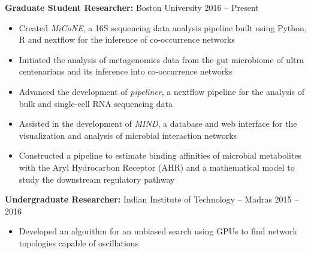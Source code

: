 \documentclass[10pt]{developercv} %
\begin{document}


\begin{minipage}[t]{\textwidth}
	\vspace{-\baselineskip} %

    \textbf{Graduate Student Researcher:} Boston University \hfill 2016 -- Present
    \vspace{-1mm}
    \begin{itemize}[itemsep=-4pt]
      \item Created \textit{MiCoNE}, a 16S sequencing data analysis pipeline built using Python, R and nextflow for the inference of co-occurrence networks
      \item Initiated the analysis of metagenomics data from the gut microbiome of ultra centenarians and its inference into co-occurrence networks
      \item Advanced the development of \textit{pipeliner}, a nextflow pipeline for the analysis of bulk and single-cell RNA sequencing data
      \item Assisted in the development of \textit{MIND}, a database and web interface for the visualization and analysis of microbial interaction networks
      \item Constructed a pipeline to estimate binding affinities of microbial metabolites with the Aryl Hydrocarbon Receptor (AHR) and a mathematical model to study the downstream regulatory pathway
    \end{itemize}


    \textbf{Undergraduate Researcher:} Indian Institute of Technology -- Madras \hfill 2015 -- 2016
    \vspace{-1mm}
    \begin{itemize}[itemsep=-4pt]
      \item Developed an algorithm for an unbiased search using GPUs to find network topologies capable of oscillations
    \end{itemize}
\end{minipage}
\end{document}
